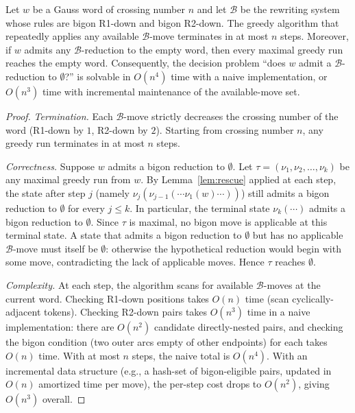 
\begin{theorem}\label{thm:greedy-main}
Let $w$ be a Gauss word of crossing number $n$ and let $\mathcal{B}$
be the rewriting system whose rules are bigon R1-down and bigon
R2-down. The greedy algorithm that repeatedly applies any available
$\mathcal{B}$-move terminates in at most $n$ steps. Moreover, if $w$
admits any $\mathcal{B}$-reduction to the empty word, then every
maximal greedy run reaches the empty word. Consequently, the decision
problem ``does $w$ admit a $\mathcal{B}$-reduction to $\emptyset$?''
is solvable in $O(n^{4})$ time with a naive implementation, or
$O(n^{3})$ time with incremental maintenance of the available-move
set.
\end{theorem}

\begin{proof}
\emph{Termination.} Each $\mathcal{B}$-move strictly decreases the
crossing number of the word (R1-down by $1$, R2-down by $2$). Starting
from crossing number $n$, any greedy run terminates in at most $n$
steps.

\emph{Correctness.} Suppose $w$ admits a bigon reduction to
$\emptyset$. Let $\tau = (\nu_1, \nu_2, \dots, \nu_k)$ be any maximal
greedy run from $w$. By Lemma~\ref{lem:rescue} applied at each step,
the state after step $j$ (namely $\nu_j(\nu_{j-1}(\cdots \nu_1(w)
\cdots))$) still admits a bigon reduction to $\emptyset$ for every
$j \leq k$. In particular, the terminal state $\nu_k(\cdots)$ admits a
bigon reduction to $\emptyset$. Since $\tau$ is maximal, no bigon move
is applicable at this terminal state. A state that admits a bigon
reduction to $\emptyset$ but has no applicable $\mathcal{B}$-move must
itself be $\emptyset$: otherwise the hypothetical reduction would
begin with some move, contradicting the lack of applicable moves.
Hence $\tau$ reaches $\emptyset$.

\emph{Complexity.} At each step, the algorithm scans for available
$\mathcal{B}$-moves at the current word. Checking R1-down positions
takes $O(n)$ time (scan cyclically-adjacent tokens). Checking R2-down
pairs takes $O(n^{3})$ time in a naive implementation: there are
$O(n^{2})$ candidate directly-nested pairs, and checking the bigon
condition (two outer arcs empty of other endpoints) for each takes
$O(n)$ time. With at most $n$ steps, the naive total is $O(n^{4})$.
With an incremental data structure (e.g., a hash-set of
bigon-eligible pairs, updated in $O(n)$ amortized time per move), the
per-step cost drops to $O(n^{2})$, giving $O(n^{3})$ overall.
\end{proof}
